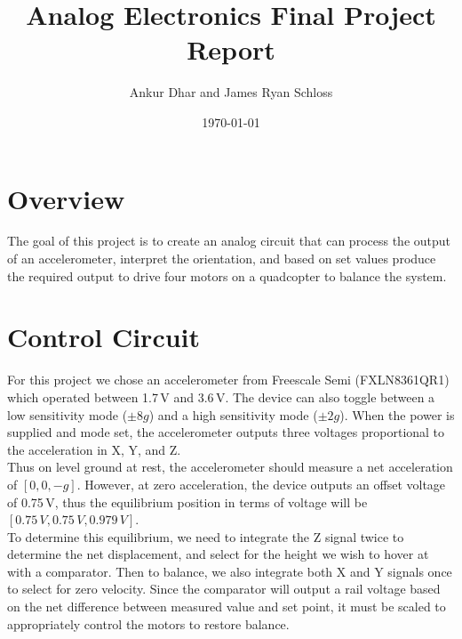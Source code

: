 \documentclass[11pt]{article} %
\title{Analog Electronics Final Project Report}
\author{Ankur Dhar and James Ryan Schloss}
\date{\today} %
\begin{document}
\maketitle
\section{Overview}
The goal of this project is to create an analog circuit that can process the output of an accelerometer, interpret the orientation, and based on set values produce the required output to drive four motors on a quadcopter to balance the system.

\section{Control Circuit}
For this project we chose an accelerometer from Freescale Semi (FXLN8361QR1) which operated between 1.7\,V and 3.6\,V. The device can also toggle between a low sensitivity mode ($\pm8g$) and a high sensitivity mode ($\pm2g$). When the power is supplied and mode set, the accelerometer outputs three voltages proportional to the acceleration in X, Y, and Z.\\
Thus on level ground at rest, the accelerometer should measure a net acceleration of $[0,0,-g]$. However, at zero acceleration, the device outputs an offset voltage of 0.75\,V, thus the equilibrium position in terms of voltage will be $[0.75\,V,0.75\,V,0.979\,V]$.\\
To determine this equilibrium, we need to integrate the Z signal twice to determine the net displacement, and select for the height we wish to hover at with a comparator. Then to balance, we also integrate both X and Y signals once to select for zero velocity. Since the comparator will output a rail voltage based on the net difference between measured value and set point, it must be scaled to appropriately control the motors to restore balance.
\end{document}
